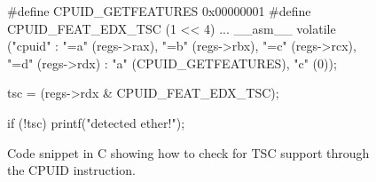 \begin{figure}[h]
\begin{lstc}
#define CPUID_GETFEATURES 0x00000001
#define CPUID_FEAT_EDX_TSC (1 << 4)
...
__asm__ volatile ("cpuid" :
    "=a" (regs->rax),
    "=b" (regs->rbx),
    "=c" (regs->rcx),
    "=d" (regs->rdx)
    : "a" (CPUID_GETFEATURES), "c" (0));

tsc  = (regs->rdx & CPUID_FEAT_EDX_TSC);

if (!tsc) printf("detected ether!\n");
\end{lstc}
\caption{\label{fig:cpuid-tsc} Code snippet in C showing how to check for TSC
  support through the CPUID instruction.}
\end{figure}

